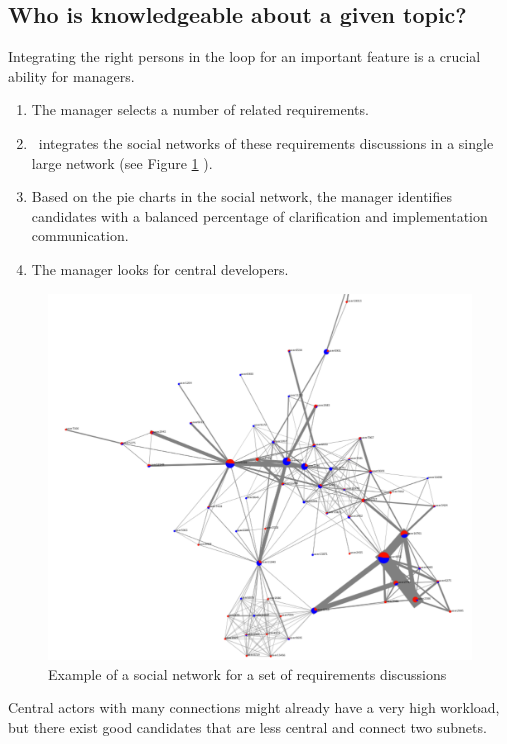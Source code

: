 \subsection{Who is knowledgeable about a given topic?}

Integrating the right persons in the loop for an important feature is a crucial ability for managers.
\begin{enumerate}
\item The manager selects a number of related requirements. 
\item \viss\ integrates the social networks of these requirements discussions in a single large network (see Figure \ref{fig:example-sn-large} ).
\item Based on the pie charts in the social network, the manager identifies candidates with a balanced percentage of clarification and implementation communication.
\item The manager looks for central developers. 
\end{enumerate}
\begin{figure}
\includegraphics[width=\columnwidth]{img/example-sn-large}
\caption{Example of a social network for a set of requirements discussions}
\label{fig:example-sn-large}
\end{figure}
Central actors with many connections might already have a very high workload, but there exist good candidates that are less central and connect two subnets.
